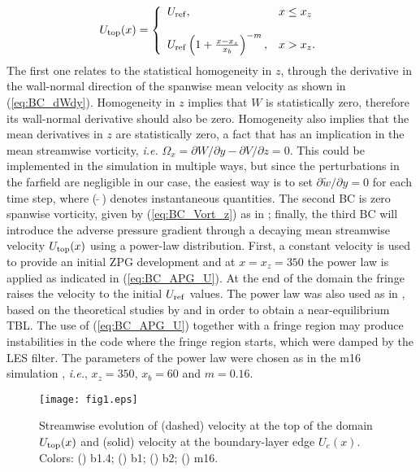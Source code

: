 \begin{equation}
    U_{\rm top}(x)= \left\{ \begin{array}{ll}
             U_{\rm ref}, &  x \leq x_z \\
             \\ U_{\rm ref}\left( 1 + \frac{x - x_{z}}{x_{b}} \right)^{-m}, & x > x_z.
             \end{array}
   \right.
\label{eq:BC_APG_U}
\end{equation}
The first one relates to the statistical homogeneity in $z$, through the derivative in the wall-normal direction of the spanwise mean velocity as shown in (\ref{eq:BC_dWdy}).
Homogeneity in $z$ implies that $W$ is statistically zero, therefore its wall-normal derivative should also be zero.
Homogeneity also implies that the mean derivatives in $z$ are statistically zero, a fact that has an implication in the mean streamwise vorticity, {\it i.e.}  $\Omega_x = \partial W/ \partial y - \partial V / \partial z = 0$.
This could be implemented in the simulation in multiple ways, but since the perturbations in the farfield are negligible in our case, the easiest way is to set $\partial \widetilde{w} / \partial y = 0$ for each time step, where ($\widetilde{ ~~ }$) denotes instantaneous quantities.
The second BC is zero spanwise vorticity, given by (\ref{eq:BC_Vort_z}) as in \cite{Kitsios2016, Abe_2019};
finally, the third BC will introduce the adverse pressure gradient through a decaying mean streamwise velocity $U_{\rm top}(x)$ using a power-law distribution. First, a constant velocity is used to provide an initial ZPG development and at $x=x_z=350$ the power law is applied as indicated in (\ref{eq:BC_APG_U}). At the end of the domain the fringe raises the velocity to the initial $U_{\rm ref}$ values. The power law was also used as in \cite{Bobke_2016}, based on the theoretical studies by \cite{Townsend_1956_structure} and \cite{mellor_gibson_1966} in order to obtain a near-equilibrium TBL.
The use of (\ref{eq:BC_APG_U}) together with a fringe region may produce instabilities in the code where the fringe region starts, which were damped by the LES filter. The parameters of the power law were chosen as in the m16 simulation \citep{Bobke_2016}, {\it i.e.},  $x_z=350$,  $x_b=60$ and $m=0.16$.



\begin{figure} 
\centering
    \texttt{[image: fig1.eps]}
  \caption{Streamwise evolution of (dashed) velocity at the top of the domain $U_{\rm top}(x)$ and (solid) velocity at the boundary-layer edge $U_e(x)$. Colors: (\protect\orangeline) b1.4; (\protect\redline) b1; (\protect\greenline) b2; (\protect\blueline) m16.}
\label{fig:U_BCs}
\end{figure}

